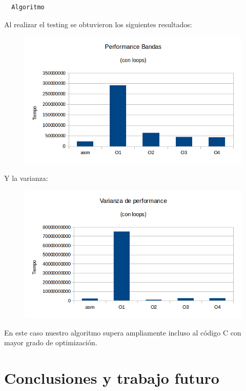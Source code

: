\documentclass[a4paper]{article}
\begin{document}
\begin{codesnippet}
\begin{verbatim}
  Algoritmo
\end{verbatim}
\end{codesnippet}

Al realizar el testing se obtuvieron los siguientes resultados:

\begin{figure}[h!]
  \begin{center}
  \includegraphics[scale=0.66]{Graficos1.4/ban/PSO.png}
  \label{nombreparareferenciar11}
  \end{center}
\end{figure}

Y la varianza:

\begin{figure}[h!]
  \begin{center}
  \includegraphics[scale=0.66]{Graficos1.4/ban/VSO.png}
  \label{nombreparareferenciar12}
  \end{center}
\end{figure}

En este caso nuestro algoritmo supera ampliamente incluso al código C con mayor grado de optimización.


\section{Conclusiones y trabajo futuro}
\end{document}

